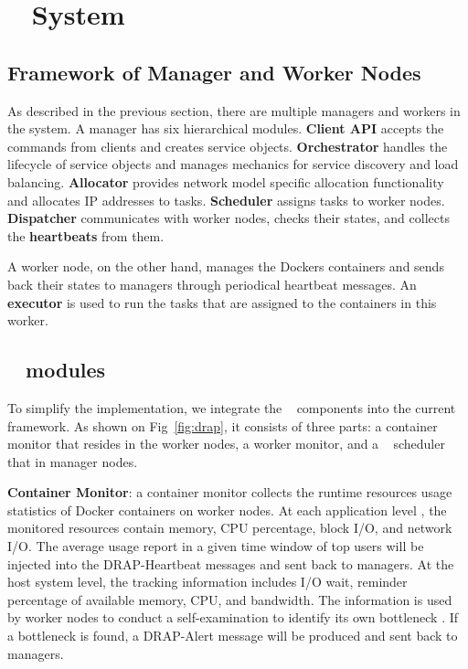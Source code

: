 \section{\sol~ System}
\label{sys}
\subsection{Framework of Manager and Worker Nodes}
As described in the previous section, there are multiple managers and workers in the system. 
A manager has six hierarchical modules.
{\bf Client API} accepts the commands from clients and creates service objects.
{\bf Orchestrator} handles the lifecycle of service objects and manages mechanics for service discovery and load balancing.
{\bf Allocator} provides network model specific allocation functionality and allocates IP addresses to tasks.
{\bf Scheduler} assigns tasks to worker nodes.
{\bf Dispatcher} communicates with worker nodes, checks their states, and collects the {\bf heartbeats} from them.

A worker node, on the other hand, manages the Dockers containers and sends back their states to managers through periodical heartbeat messages.
An {\bf executor} is used to run the tasks that are assigned to the containers in this worker. 


\subsection{\sol~ modules}
To simplify the implementation, we integrate the \sol~ components into the current framework. As shown on Fig~\ref{fig:drap},
it  consists of three parts: a container monitor that resides in the worker nodes, a worker monitor, and a \sol~ scheduler that in manager nodes.

{\bf Container Monitor}: a container monitor collects the runtime resources usage statistics of Docker containers on worker nodes. 
At each application level , the monitored resources contain memory, CPU percentage, block I/O, and network I/O. 
The average usage report in a given time window  of top users will be injected into the DRAP-Heartbeat messages and sent back to managers.
At the host system level, the tracking information includes I/O wait, reminder percentage of available memory, CPU, and bandwidth. 
The information is used by worker nodes to conduct a self-examination to identify its own bottleneck . 
If a bottleneck is found, a DRAP-Alert message will be produced and sent back to managers.

